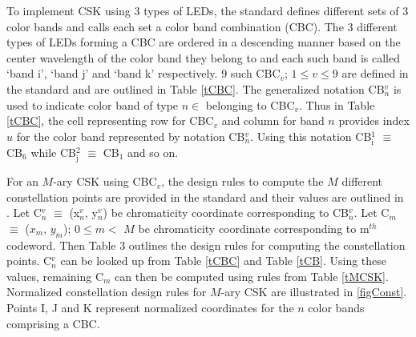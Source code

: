 To implement CSK using 3 types of LEDs, the standard defines different sets of 3 color bands and calls each set a color band combination (CBC). The 3 different types of LEDs forming a CBC are ordered in a descending manner based on the center wavelength of the color band they belong to and each such band is called `band i', `band j' and `band k' respectively. 9 such CBC$_{v}$; $1\leq v\leq 9$ are defined in the standard and are outlined in Table \ref{tCBC}. The generalized notation CB$^{v}_{n}$ is used to indicate color band of type $n\in$  belonging to CBC$_{v}$. Thus in Table \ref{tCBC}, the cell representing row for CBC$_{v}$ and column for band $n$ provides index $u$ for the color band represented by notation CB$^{v}_{n}$. Using this notation CB$^{1}_{\text{i}}$ $\equiv$ CB$_{6}$ while CB$^{2}_{\text{j}}$ $\equiv$ CB$_{1}$ and so on.


For an $M$-ary CSK using CBC$_{v}$, the design rules to compute the $M$ different constellation points are provided in the standard and their values are outlined in \cite{cskxy}. Let C$^{v}_{n}$ $\equiv$ (x$^{v}_{n}$, y$^{v}_{n}$) be chromaticity coordinate corresponding to CB$^{v}_{n}$. Let C$_{m}$ $\equiv$ ($x_{m}$, $y_{m}$); $0\leq m <$ $M$ be chromaticity coordinate corresponding to m$^{th}$ codeword. Then Table 3 outlines the design rules for computing the constellation points. C$^{v}_{n}$ can be looked up from Table \ref{tCBC} and Table \ref{tCB}. Using these values, remaining C$_{m}$ can then be computed using rules from Table \ref{tMCSK}. Normalized constellation design rules for $M$-ary CSK are illustrated in \figurename{ }\ref{figConst}. Points I, J and K represent normalized coordinates for the $n$ color bands comprising a CBC. 

%
